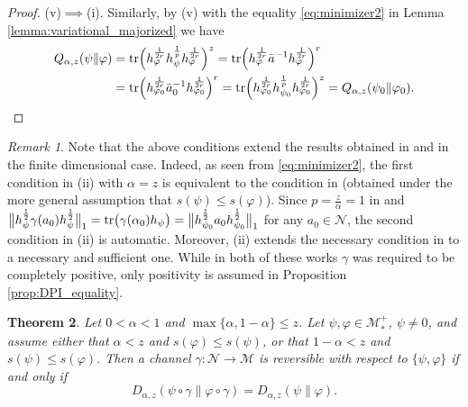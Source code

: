 \documentclass[12pt]{article}
\newtheorem{theorem}{Theorem}[section]
\theoremstyle{definition}
\theoremstyle{remark}
\newtheorem{remark}[theorem]{Remark}
\numberwithin{equation}{section}
\def\Me{\mathcal M}
\def\Ne{\mathcal N}
\def\Tr{\mathrm{tr}}
\def\ffi{\varphi}
\begin{document}
\begin{proof}
(v)$\implies$(i).\enspace
Similarly, by (v) with the equality \eqref{eq:minimizer2} in Lemma
\ref{lemma:variational_majorized} we have
\begin{align*}
Q_{\alpha,z}(\psi\|\ffi)
&=\Tr\Bigl(h_\ffi^{1\over2r}h_\psi^{1\over p}h_\ffi^{1\over2r}\Bigr)^z
=\Tr\Bigl(h_\ffi^{1\over2r}\bar a^{-1}h_\ffi^{1\over2r}\Bigr)^{r} \\
&=\Tr\Bigl(h_{\ffi_0}^{1\over2r}\bar a_0^{-1}h_{\ffi_0}^{1\over2r}\Bigr)^{r}
=\Tr\Bigl(h_{\ffi_0}^{1\over2r}h_{\psi_0}^{1\over p}h_{\ffi_0}^{1\over2r}\Bigr)^z
=Q_{\alpha,z}(\psi_0\|\ffi_0).
\end{align*}
\end{proof}


\begin{remark}\label{rem:conditions} Note that the above conditions extend the results
obtained in \cite{leditzky2017data} and \cite{zhang2020equality} in the finite dimensional case.
Indeed, as seen from \eqref{eq:minimizer2}, the first condition in (ii) with $\alpha=z$ is 
equivalent to the condition in \cite[Theorem 1]{leditzky2017data} (obtained under the more
general assumption that $s(\psi)\le s(\ffi)$). Since $p=\frac{z}{\alpha}=1$ in
\cite{leditzky2017data} and 
$\big\|h_\psi^{1\over2}\gamma(a_0)h_\psi^{1\over2}\big\|_{1}=\Tr
\bigl(\gamma(\alpha_0)h_\psi\bigr)=\big\|h_{\psi_0}^{1\over2}a_0h_{\psi_0}^{1\over2}\big\|_{1}$
for any $a_0\in \Ne$, the second condition in (ii) is automatic.
Moreover, (ii) extends the necessary condition in \cite[Theorem 1.2(2)]{zhang2020equality}
to a necessary and sufficient one. While in both of these works $\gamma$ was required
to be completely positive, only positivity   is assumed in Proposition
\ref{prop:DPI_equality}.

\end{remark}


\begin{theorem}\label{thm:suffle1} Let $0<\alpha<1$ and $\max\{\alpha,1-\alpha\}\le
z$. Let $\psi,\varphi\in \Me_*^+$, $\psi\ne0$, and assume either that $\alpha<z$ and $s(\ffi)\le
s(\psi)$, or that $1-\alpha<z$ and $s(\psi)\le s(\ffi)$. 
Then a channel $\gamma:\Ne \to \Me$ is reversible with respect to
$\{\psi,\varphi\}$ if and only if
\[
D_{\alpha,z}(\psi\circ\gamma\|\varphi\circ\gamma)=D_{\alpha,z}(\psi\|\varphi).
\]
\end{theorem}
\end{document}
